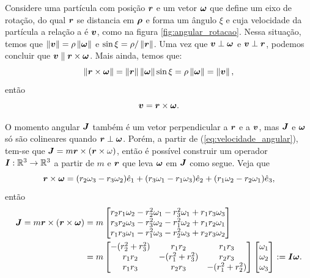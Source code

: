 Considere uma partícula com posição $\bm r$ e um vetor $\bm \omega$ que define um eixo de rotação, do qual $\bm r$ se distancia em $\bm \rho$ e forma um ângulo $\xi$ e cuja velocidade da partícula a relação a é $\bm v$, como na figura \ref{fig:angular_rotacao}. Nessa situação, temos que $\left\Vert \bm v \right\Vert = \rho \left\Vert \bm \omega \right\Vert$ e $\sin \xi = \rho / \left\Vert \bm r \right\Vert$. Uma vez que $\bm v \perp \bm \omega$ e $\bm v \perp \bm r$, podemos concluir que $\bm v \parallel \bm r \times \bm \omega$. Mais ainda, temos que:
\begin{equation*}
    \left\Vert \bm r \times \bm \omega \right\Vert 
    = \left\Vert \bm r \right\Vert \left\Vert \bm \omega \right\Vert \sin \xi
    = \rho \left\Vert \bm \omega \right\Vert = \left\Vert \bm v \right\Vert,
\end{equation*}
então
\begin{equation}\label{eq:velocidade_angular}
    \bm v = \bm r \times \bm \omega.
\end{equation}

O momento angular $\bm J$ também é um vetor perpendicular a $\bm r$ e a $\bm v$, mas $\bm J$ e $\bm \omega$ só são colineares quando $\bm r \perp \bm \omega$. Porém, a partir de (\ref{eq:velocidade_angular}), tem-se que $\bm J = m \bm r \times (\bm r \times \omega)$, então é possível construir um operador $\bm I: \mathbb{R}^3 \to \mathbb{R}^3$ a partir de $m$ e $\bm r$ que leva $\bm \omega$ em $\bm J$ como segue. Veja que
\begin{equation*}
    \bm r \times \bm \omega = (r_2 \omega_3 - r_3 \omega_2) \hat e_1 + (r_3 \omega_1 - r_1 \omega_3) \hat e_2 + (r_1 \omega_2 - r_2 \omega_1) \hat e_3,
\end{equation*}
então
\begin{align*}
    \bm J = m \bm r \times (\bm r \times \bm \omega) &=
    m \begin{bmatrix}
        r_2 r_1 \omega_2 - r_2^2 \omega_1 - r_3^2 \omega_1 + r_1 r_3 \omega_3 \\
        r_3 r_2 \omega_3 - r_3^2 \omega_2 - r_1^2 \omega_2 + r_1 r_2 \omega_1 \\
        r_1 r_3 \omega_1 - r_1^2 \omega_3 - r_2^2 \omega_3 + r_2 r_3 \omega_2
    \end{bmatrix} \\ &=
    m \begin{bmatrix}
        -(r_2^2 + r_3^2) & r_1 r_2 & r_1 r_3 \\
        r_1 r_2 & -(r_1^2 + r_3^2) & r_2 r_3 \\
        r_1 r_3 & r_2 r_3 & - (r_1^2 + r_2^2)
    \end{bmatrix}
    \begin{bmatrix}
        \omega_1 \\ \omega_2 \\ \omega_3
    \end{bmatrix}
    := \bm I \bm \omega.
\end{align*}

